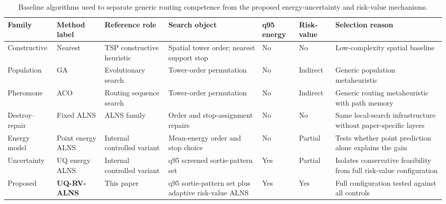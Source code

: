 ﻿\begin{table}[t]
\centering
\caption{Baseline algorithms used to separate generic routing competence from the proposed energy-uncertainty and risk-value mechanisms.}
\label{tab:baseline-design}
\small
\setlength{\tabcolsep}{2.3pt}
\renewcommand{\arraystretch}{1.08}
\begin{tabularx}{\textwidth}{@{}>{\raggedright\arraybackslash}p{}>{\raggedright\arraybackslash}p{}>{\raggedright\arraybackslash}p{}>{\raggedright\arraybackslash}p{}>{\centering\arraybackslash}p{}>{\centering\arraybackslash}p{}>{\raggedright\arraybackslash}X@{}}
\toprule
Family & Method label & Reference role & Search object & q95 energy & Risk-value & Selection reason \\
\midrule
Constructive & Nearest & TSP constructive heuristic \citep{rosenkrantz1977analysis} & Spatial tower order; nearest support stop & No & No & Low-complexity spatial baseline \\
Population & GA & Evolutionary search \citep{holland1975adaptation} & Tower-order permutation & No & Indirect & Generic population metaheuristic \\
Pheromone & ACO & Routing sequence search \citep{dorigo1997ant} & Tower-order permutation & No & Indirect & Generic routing metaheuristic with path memory \\
Destroy--repair & Fixed ALNS & ALNS family \citep{ropke2006alns,sacramento2019alns} & Order and stop-assignment repairs & No & No & Same local-search infrastructure without paper-specific layers \\
Energy model & Point energy ALNS & Internal controlled variant & Mean-energy order and stop choice & No & Partial & Tests whether point prediction alone explains the gain \\
Uncertainty & UQ energy ALNS & Internal controlled variant & q95 screened sortie-pattern set & Yes & Partial & Isolates conservative feasibility from full risk-value configuration \\
\rowcolor{gray!10}
Proposed & \textbf{UQ-RV-ALNS} & This paper & q95 sortie-pattern set plus adaptive risk-value ALNS & Yes & Yes & Full configuration tested against all controls \\
\bottomrule
\end{tabularx}
\end{table}
